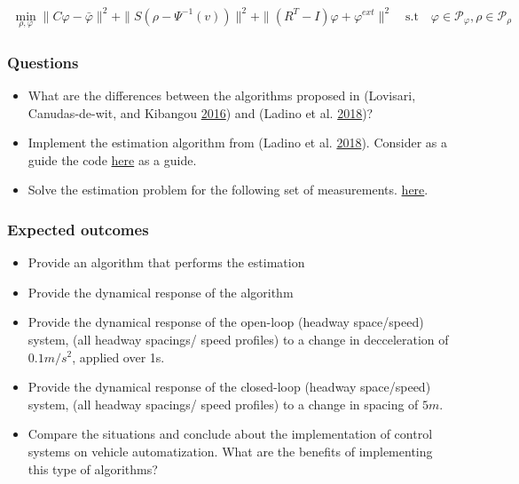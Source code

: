 \documentclass[]{book}
\providecommand{\tightlist}{%
  \setlength{\itemsep}{0pt}\setlength{\parskip}{0pt}}
\theoremstyle{definition}
\theoremstyle{definition}
\theoremstyle{definition}
\theoremstyle{remark}
\begin{document}
\begin{align}
\underset{\rho,\varphi}{\min} \|C\varphi - \bar{\varphi}\|^2 + \|S(\rho - \Psi^{-1}(v))\|^2 +  \|(R^T-I)\varphi +\varphi^{ext}\|^2\quad \text{s.t}\quad \varphi \in \mathcal{P}_\varphi, \rho \in \mathcal{P}_\rho
\end{align}

\hypertarget{questions-10}{%
\subsubsection*{Questions}\label{questions-10}}

\begin{itemize}
\tightlist
\item
  What are the differences between the algorithms proposed in (Lovisari,
  Canudas-de-wit, and Kibangou
  \protect\hyperlink{ref-Lovisari2016}{2016}) and (Ladino et al.
  \protect\hyperlink{ref-Ladino2018}{2018})?
\item
  Implement the estimation algorithm from (Ladino et al.
  \protect\hyperlink{ref-Ladino2018}{2018}). Consider as a guide the
  code
  \href{https://github.com/aladinoster/density-reconstruction/blob/master/Estimation.m}{here}
  as a guide.
\item
  Solve the estimation problem for the following set of measurements.
  \href{https://github.com/aladinoster/density-reconstruction/blob/master/NoEq_4x4.mat}{here}.
\end{itemize}

\hypertarget{expected-outcomes-10}{%
\subsubsection*{Expected outcomes}\label{expected-outcomes-10}}

\begin{itemize}
\item
  Provide an algorithm that performs the estimation
\item
  Provide the dynamical response of the algorithm
\item
  Provide the dynamical response of the open-loop (headway space/speed)
  system, (all headway spacings/ speed profiles) to a change in
  decceleration of \(0.1m/s^2\), applied over 1s.\\
\item
  Provide the dynamical response of the closed-loop (headway
  space/speed) system, (all headway spacings/ speed profiles) to a
  change in spacing of \(5m\).
\item
  Compare the situations and conclude about the implementation of
  control systems on vehicle automatization. What are the benefits of
  implementing this type of algorithms?
\end{itemize}
\end{document}
